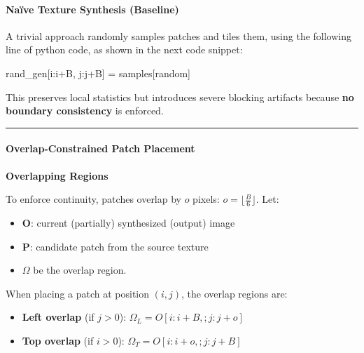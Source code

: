 \documentclass[11pt]{article}
\providecommand{\tightlist}{%
      \setlength{\itemsep}{0pt}\setlength{\parskip}{0pt}}
\newenvironment{Shaded}{}{}
\newcommand{\NormalTok}[1]{{#1}}
\newcommand{\OperatorTok}[1]{\textcolor[rgb]{0.40,0.40,0.40}{{#1}}}
\begin{document}
\hypertarget{nauxefve-texture-synthesis-baseline}{%
\paragraph{\texorpdfstring{\textbf{Naïve Texture Synthesis
(Baseline)}}{Naïve Texture Synthesis (Baseline)}}\label{nauxefve-texture-synthesis-baseline}}

A trivial approach randomly samples patches and tiles them, using the
following line of python code, as shown in the next code snippet:

\begin{Shaded}
\begin{Highlighting}[]
\NormalTok{rand\_gen[i:i}\OperatorTok{+}\NormalTok{B, j:j}\OperatorTok{+}\NormalTok{B] }\OperatorTok{=}\NormalTok{ samples[random]}
\end{Highlighting}
\end{Shaded}

This preserves local statistics but introduces severe blocking artifacts
because \textbf{no boundary consistency} is enforced.

\begin{center}\rule{0.5\linewidth}{0.5pt}\end{center}

\hypertarget{overlap-constrained-patch-placement}{%
\paragraph{\texorpdfstring{\textbf{Overlap-Constrained Patch
Placement}}{Overlap-Constrained Patch Placement}}\label{overlap-constrained-patch-placement}}

\textbf{Overlapping Regions}

To enforce continuity, patches overlap by \(o\) pixels:
\(o = \lfloor \frac{B}{6} \rfloor\). Let:

\begin{itemize}
\tightlist
\item
  \(\mathbf{O}\): current (partially) synthesized (output) image
\item
  \(\mathbf{P}\): candidate patch from the source texture
\item
  \(\Omega\) be the overlap region.
\end{itemize}

When placing a patch at position \((i,j)\), the overlap regions are:

\begin{itemize}
\tightlist
\item
  \textbf{Left overlap} (if \(j > 0\)):
  \(\Omega_L = O[i : i+B,; j : j+o]\)
\item
  \textbf{Top overlap} (if \(i > 0\)):
  \(\Omega_T = O[i : i+o,; j : j+B]\)
\end{itemize}
\end{document}
